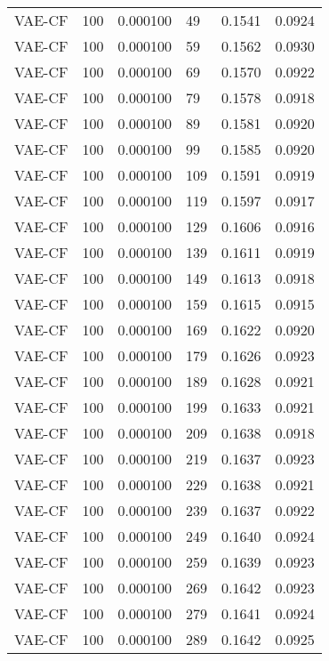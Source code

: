 \begin{tabular}{llrlrr}
  VAE-CF &  100 &  0.000100 &    49 &  0.1541 &       0.0924 \\
  VAE-CF &  100 &  0.000100 &    59 &  0.1562 &       0.0930 \\
  VAE-CF &  100 &  0.000100 &    69 &  0.1570 &       0.0922 \\
  VAE-CF &  100 &  0.000100 &    79 &  0.1578 &       0.0918 \\
  VAE-CF &  100 &  0.000100 &    89 &  0.1581 &       0.0920 \\
  VAE-CF &  100 &  0.000100 &    99 &  0.1585 &       0.0920 \\
  VAE-CF &  100 &  0.000100 &   109 &  0.1591 &       0.0919 \\
  VAE-CF &  100 &  0.000100 &   119 &  0.1597 &       0.0917 \\
  VAE-CF &  100 &  0.000100 &   129 &  0.1606 &       0.0916 \\
  VAE-CF &  100 &  0.000100 &   139 &  0.1611 &       0.0919 \\
  VAE-CF &  100 &  0.000100 &   149 &  0.1613 &       0.0918 \\
  VAE-CF &  100 &  0.000100 &   159 &  0.1615 &       0.0915 \\
  VAE-CF &  100 &  0.000100 &   169 &  0.1622 &       0.0920 \\
  VAE-CF &  100 &  0.000100 &   179 &  0.1626 &       0.0923 \\
  VAE-CF &  100 &  0.000100 &   189 &  0.1628 &       0.0921 \\
  VAE-CF &  100 &  0.000100 &   199 &  0.1633 &       0.0921 \\
  VAE-CF &  100 &  0.000100 &   209 &  0.1638 &       0.0918 \\
  VAE-CF &  100 &  0.000100 &   219 &  0.1637 &       0.0923 \\
  VAE-CF &  100 &  0.000100 &   229 &  0.1638 &       0.0921 \\
  VAE-CF &  100 &  0.000100 &   239 &  0.1637 &       0.0922 \\
  VAE-CF &  100 &  0.000100 &   249 &  0.1640 &       0.0924 \\
  VAE-CF &  100 &  0.000100 &   259 &  0.1639 &       0.0923 \\
  VAE-CF &  100 &  0.000100 &   269 &  0.1642 &       0.0923 \\
  VAE-CF &  100 &  0.000100 &   279 &  0.1641 &       0.0924 \\
  VAE-CF &  100 &  0.000100 &   289 &  0.1642 &       0.0925 \\

\end{tabular}
